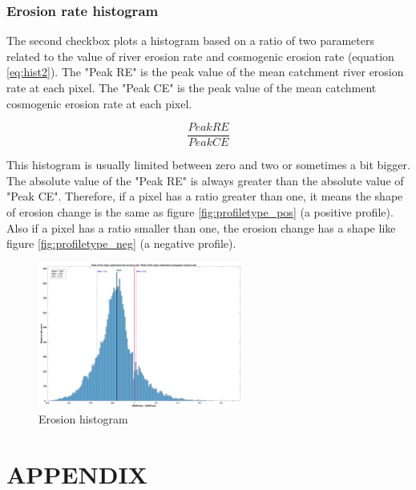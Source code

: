 \documentclass[11pt,a4paper,titlepage]{report}
\begin{document}
\subsection{Erosion rate histogram}

The second checkbox plots a histogram based on a ratio of two parameters related to the value of river erosion rate and cosmogenic erosion rate (equation \ref{eq:hist2}). The "Peak RE" is the peak value of the mean catchment river erosion rate at each pixel. The "Peak CE" is the peak value of the mean catchment cosmogenic erosion rate at each pixel.

\begin{equation}
\frac{Peak RE}{Peak CE}
\label{eq:hist2}
\end{equation}

This histogram is usually limited between zero and two or sometimes a bit bigger. The absolute value of the "Peak RE" is always greater than the absolute value of "Peak CE". Therefore, if a pixel has a ratio greater than one, it means the shape of erosion change is the same as figure \ref{fig:profiletype_pos} (a positive profile). Also if a pixel has a ratio smaller than one, the erosion change has a shape like figure \ref{fig:profiletype_neg} (a negative profile).

\begin{figure}[H]
    \centering
    \includegraphics[width=0.6\textwidth]{hist_E.png}
    \caption[Erosion histogram]{Erosion histogram}
    \label{fig:hist_E}    
\end{figure}

\chapter{APPENDIX}\label{sec:apndx}
\end{document}

